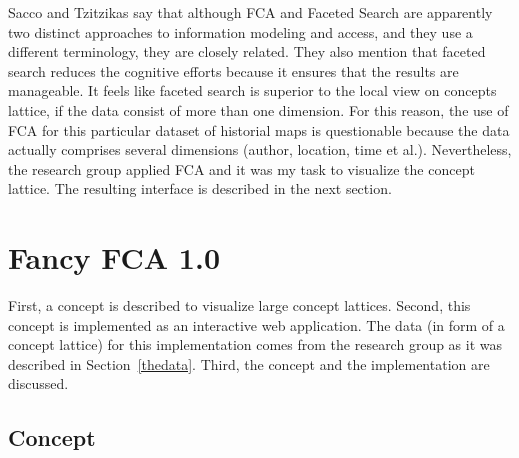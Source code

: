 \documentclass[11pt]{report}
\begin{document}
Sacco and Tzitzikas \cite{Sacco2009} say that although FCA and Faceted Search are apparently two distinct approaches to information modeling and access, and they use a different terminology, they are closely related. They also mention that faceted search reduces the cognitive efforts because it ensures that the results are manageable. It feels like faceted search is superior to the local view on concepts lattice, if the data consist of more than one dimension. For this reason, the use of FCA for this particular dataset of historial maps is questionable because the data actually comprises several dimensions (author, location, time et al.). Nevertheless, the research group applied FCA and it was my task to visualize the concept lattice. The resulting interface is described in the next section.

\chapter{Fancy FCA 1.0}
\label{Fancy 1.0}

First, a concept is described to visualize large concept lattices. Second, this concept is implemented as an interactive web application. The data (in form of a concept lattice) for this implementation comes from the research group as it was described in Section~\ref{thedata}. Third, the concept and the implementation are discussed.

\section{Concept}
\end{document}
